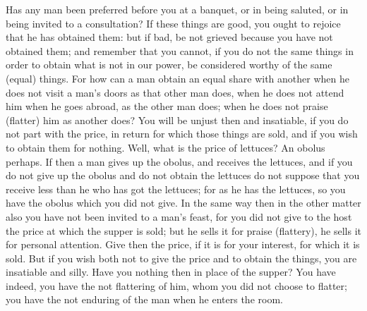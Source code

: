 Has any man been preferred before you at  a banquet, or in being saluted, or in
being invited to a consultation? If these things are good, you ought to rejoice
that he  has obtained them:  but if  bad, be not  grieved because you  have not
obtained them; and remember  that you cannot, if you do not  the same things in
order to  obtain what is  not in  our power, be  considered worthy of  the same
(equal) things. For  how can a man  obtain an equal share with  another when he
does not visit  a man's doors as that  other man does, when he  does not attend
him  when he  goes abroad,  as the  other  man does;  when he  does not  praise
(flatter) him as another  does? You will be unjust then  and insatiable, if you
do not part with  the price, in return for which those things  are sold, and if
you wish to  obtain them for nothing.  Well, what is the price  of lettuces? An
obolus perhaps. If then  a man gives up the obolus,  and receives the lettuces,
and if  you do not  give up the  obolus and do not  obtain the lettuces  do not
suppose that you receive  less than he who has got the lettuces;  for as he has
the lettuces, so  you have the obolus which  you did not give. In  the same way
then in the other  matter also you have not been invited to  a man's feast, for
you did  not give to  the host the  price at which the  supper is sold;  but he
sells it for  praise (flattery), he sells it for  personal attention. Give then
the price, if  it is for your interest,  for which it is sold. But  if you wish
both not  to give the price  and to obtain  the things, you are  insatiable and
silly. Have you nothing then in place  of the supper? You have indeed, you have
the not flattering of him, whom you did not choose to flatter; you have the not
enduring of the man when he enters the room.
